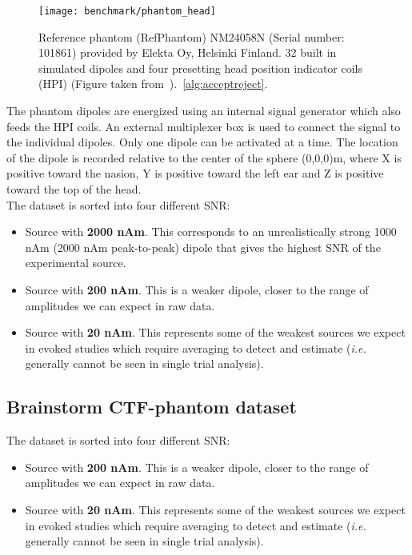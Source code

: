 \begin{figure}[tb]
   \centering
\texttt{[image: benchmark/phantom\_head]}
\caption{Reference phantom (RefPhantom) NM24058N (Serial number: 101861) provided by Elekta Oy, Helsinki Finland. 32 built in simulated dipoles and four presetting head position indicator coils (HPI) (Figure taken from~\cite{hazim2015magnetoencephalography}).~\ref{alg:acceptreject}.}
   \label{fig:phantom_head}
\end{figure}

The phantom dipoles are energized using an internal signal generator which also feeds the HPI coils. An external multiplexer box is used to connect the signal to the individual dipoles. Only one dipole can be activated at a time. The location of the dipole is recorded relative to the center of the sphere (0,0,0)m, where X is positive toward the nasion, Y is positive toward the left ear and Z is positive toward the top of the head.\\

The dataset is sorted into four different SNR:
\begin{itemize}
\item Source with \textbf{2000 nAm}. This corresponds to an unrealistically strong 1000 nAm (2000 nAm peak-to-peak) dipole that gives the highest SNR of the experimental source.
\item Source with \textbf{200 nAm}. This is a weaker dipole, closer to the range of amplitudes we can expect in raw data.
\item Source with \textbf{20 nAm}. This represents some of the weakest sources we expect in evoked studies which require averaging to detect and estimate (\textit{i.e.} generally cannot be seen in single trial analysis).
\end{itemize}

\subsection{Brainstorm CTF-phantom dataset}

The dataset is sorted into four different SNR:
\begin{itemize}
\item Source with \textbf{200 nAm}. This is a weaker dipole, closer to the range of amplitudes we can expect in raw data.
\item Source with \textbf{20 nAm}. This represents some of the weakest sources we expect in evoked studies which require averaging to detect and estimate (\textit{i.e.} generally cannot be seen in single trial analysis).
\end{itemize}


